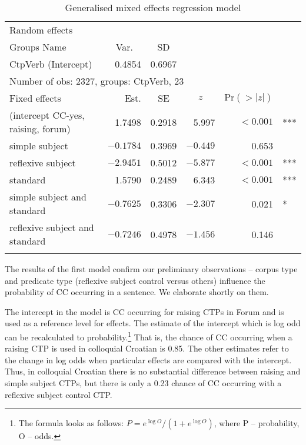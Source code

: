 \begin{table}
\caption{Generalised mixed effects regression model\label{T15:r}}
\begin{tabular}{lrrrr@{\,}l}
\lsptoprule
Random effects & \\
Groups  Name & \multicolumn{1}{c}{Var.} & \multicolumn{1}{c}{SD} &&& \\\midrule
CtpVerb (Intercept) &  0.4854 & 0.6967 &&& \\
\multicolumn{5}{l}{Number of obs: 2327, groups:  CtpVerb, 23} \\\midrule
Fixed effects &Est.& \multicolumn{1}{c}{SE}& \multicolumn{1}{c}{$z$} & $\text{Pr}(>|z|)$ &\\\midrule
(intercept CC-yes, raising, forum) & 1.7498 &  0.2918 & 5.997 & $<0.001$ & *** \\
simple subject  & $-0.1784$ & 0.3969 & $-0.449$ & 0.653 & \\
reflexive subject & $-2.9451$ & 0.5012 & $-5.877$ & $<0.001$ & ***\\
standard  & 1.5790 & 0.2489 & 6.343 & $<0.001$ & *** \\
simple subject and standard & $-0.7625$ & 0.3306 & $-2.307$ & 0.021 & * \\
reflexive subject and standard & $-0.7246$ & 0.4978 & $-1.456$ & 0.146 & \\
\lspbottomrule
\end{tabular}
\end{table}

The results of the first model confirm our preliminary observations – corpus type and predicate type (reflexive subject control versus others) influence the probability of CC occurring in a sentence. We elaborate shortly on them. 

The intercept in the model is CC occurring for raising CTPs in Forum and is used as a reference level for effects. The estimate of the intercept which is log odd can be recalculated to probability.\footnote{The formula looks as follows: $P=e^{\log O} / (1+e^{\log O})$, where P -- probability, O -- odds.} That is, the chance of CC occurring when a raising CTP is used in colloquial Croatian is 0.85. The other estimates refer to the change in log odds when particular effects are compared with the intercept. Thus, in colloquial Croatian there is no substantial difference between raising and simple subject CTPs, but there is only a 0.23 chance of CC occurring with a reflexive subject control CTP. 


